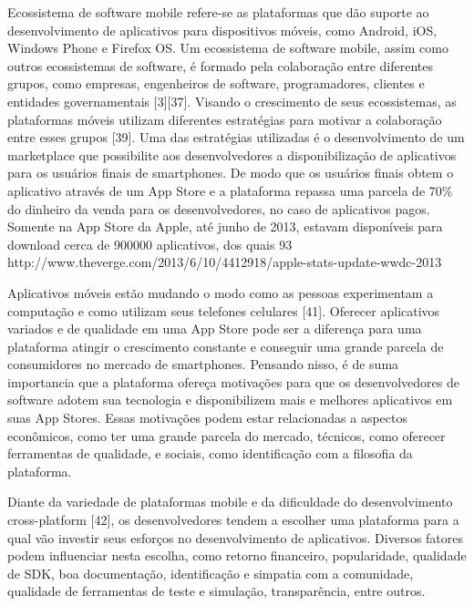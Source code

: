 \documentclass[conference]{IEEEtran}
\begin{document}
Ecossistema de software mobile refere-se as plataformas que dão suporte ao desenvolvimento de aplicativos para dispositivos móveis, como Android, iOS, Windows Phone e Firefox OS. Um ecossistema de software mobile, assim como outros ecossistemas de software, é formado pela colaboração entre diferentes grupos, como empresas, engenheiros de software, programadores, clientes e entidades governamentais [3][37]. Visando o crescimento de seus ecossistemas, as plataformas móveis utilizam diferentes estratégias para motivar a colaboração entre esses grupos [39]. Uma das estratégias utilizadas é o desenvolvimento de um marketplace que possibilite aos desenvolvedores a disponibilização de aplicativos para os usuários finais de smartphones. De modo que os usuários finais obtem o aplicativo através de um App Store e a plataforma repassa uma parcela de 70\% do dinheiro da venda para os desenvolvedores, no caso de aplicativos pagos. Somente na App Store da Apple, até junho de 2013, estavam disponíveis para download cerca de 900000 aplicativos, dos quais 93%
http://www.theverge.com/2013/6/10/4412918/apple-stats-update-wwdc-2013  

Aplicativos móveis estão mudando o modo como as pessoas experimentam a computação e como utilizam seus telefones celulares [41]. Oferecer aplicativos variados e de qualidade em uma App Store pode ser a diferença para uma plataforma atingir o crescimento constante e conseguir uma grande parcela de consumidores no mercado de smartphones. Pensando nisso, é de suma importancia que a plataforma ofereça motivações para que os desenvolvedores de software adotem sua tecnologia e disponibilizem mais e melhores aplicativos em suas App Stores. Essas motivações podem estar relacionadas a aspectos econômicos, como ter uma grande parcela do mercado, técnicos, como oferecer ferramentas de qualidade, e sociais, como identificação com a filosofia da plataforma.

Diante da variedade de plataformas mobile e da dificuldade do desenvolvimento cross-platform [42], os desenvolvedores tendem a escolher uma plataforma para a qual vão investir seus esforços no desenvolvimento de aplicativos. Diversos fatores podem influenciar nesta escolha, como retorno financeiro, popularidade, qualidade de SDK, boa documentação, identificação e simpatia com a comunidade, qualidade de ferramentas de teste e simulação, transparência, entre outros. 
\end{document}
